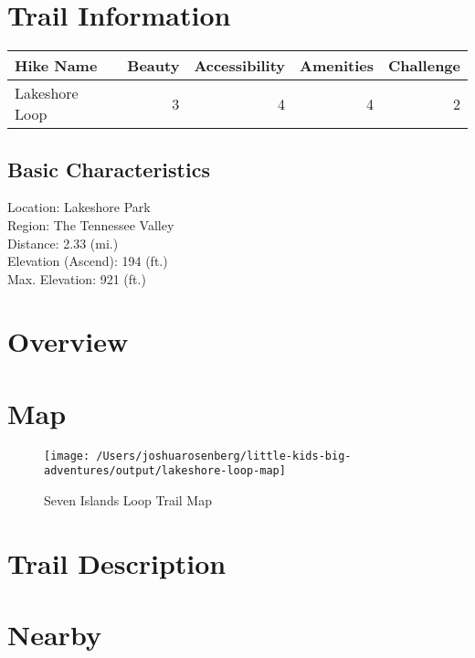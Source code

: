 \documentclass[
]{book}
\begin{document}
\hypertarget{trail-information-4}{%
\section{Trail Information}\label{trail-information-4}}

\begin{tabular}{l|r|r|r|r}
\hline
Hike Name & Beauty & Accessibility & Amenities & Challenge\\
\hline
Lakeshore Loop & 3 & 4 & 4 & 2\\
\hline
\end{tabular}

\hypertarget{basic-characteristics-4}{%
\subsection{Basic Characteristics}\label{basic-characteristics-4}}

Location: Lakeshore Park\\
Region: The Tennessee Valley\\
Distance: 2.33 (mi.)\\
Elevation (Ascend): 194 (ft.)\\
Max. Elevation: 921 (ft.)

\hypertarget{overview-4}{%
\section{Overview}\label{overview-4}}

\hypertarget{map-4}{%
\section{Map}\label{map-4}}

\begin{figure}
\texttt{[image: /Users/joshuarosenberg/little-kids-big-adventures/output/lakeshore-loop-map]} \caption{Seven Islands Loop Trail Map}\label{fig:unnamed-chunk-17}
\end{figure}

\hypertarget{trail-description-4}{%
\section{Trail Description}\label{trail-description-4}}

\hypertarget{nearby-4}{%
\section{Nearby}\label{nearby-4}}
\end{document}
